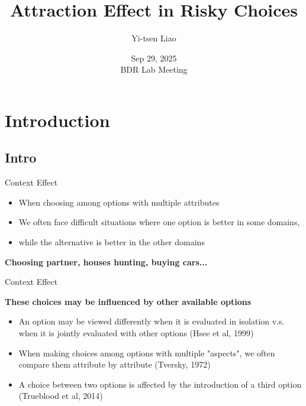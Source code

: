 \documentclass[
  ignorenonframetext,
  aspectratio=169]{beamer}
\author{}
\date{\vspace{-2.5em}}
\begin{document}
\begin{frame}
\title{Attraction Effect in Risky Choices}
\author{Yi-tsen Liao}
\date{Sep 29, 2025\\BDR Lab Meeting}

\maketitle
\end{frame}

\section{Introduction}\label{introduction}

\subsection{Intro}\label{intro}

\begin{frame}{Context Effect}
\label{context-effect}
\begin{itemize}
  \item When choosing among options with multiple attributes
  \pause
  \item We often face difficult situations where one option is better in some domains,
  \pause
  \item while the alternative is better in the other domains
\end{itemize}

\vfill

\begin{center}
\pause
  \textbf{Choosing partner, houses hunting, buying cars...}
\end{center}
\end{frame}

\begin{frame}{Context Effect}
\label{context-effect-1}
\begin{center}
  \textbf{These choices may be influenced by other available options}
\end{center}

\pause
\begin{itemize}
  \item An option may be viewed differently when it is evaluated in isolation v.s. when it is jointly evaluated with other options (Hsee et al, 1999)
  \pause
  \item When making choices among options with multiple "aspects", we often compare them attribute by attribute (Tversky, 1972)
  \pause
  \item A choice between two options is affected by the
introduction of a third option (Trueblood et al, 2014)
\end{itemize}
\end{frame}
\end{document}
